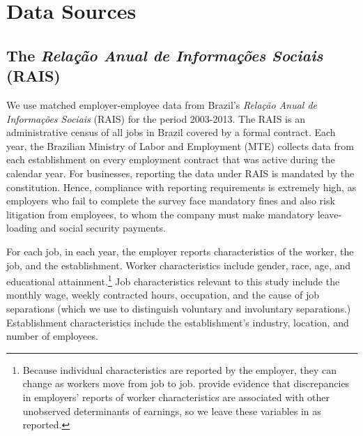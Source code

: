
\section{Data Sources}
\label{app:EmpiricalDetails}

\subsection{The \emph{Rela\c{c}\~{a}o Anual de Informa\c{c}\~{o}es Sociais} (RAIS)}
We use matched employer-employee data from Brazil's \emph{Rela\c{c}\~{a}o Anual de Informa\c{c}\~{o}es Sociais} (RAIS) for the period 2003-2013.
The RAIS is an administrative census of all jobs in Brazil covered by a formal contract. Each year, the Brazilian Ministry of Labor and Employment (MTE) collects data from each establishment on every employment contract that was active during the calendar year. For businesses, reporting the data under RAIS is mandated by the constitution. Hence, compliance with reporting requirements is extremely high, as employers who fail to complete the survey face mandatory fines and also risk litigation from employees, to whom the company must make mandatory leave-loading and social security payments.

For each job, in each year, the employer reports characteristics of the worker, the job, and the establishment. 
Worker characteristics include gender, race, age, and educational attainment.\footnote{ 
Because individual characteristics are reported by the employer, they can change as workers move from job to job. 
\citet*{CRS:Race:JHR:2017} provide evidence that discrepancies in employers' reports of worker characteristics are associated with other unobserved determinants of earnings, so we leave these variables in as reported.} 
Job characteristics relevant to this study include the monthly wage, weekly contracted hours, occupation, and the cause of job separations (which we use to distinguish voluntary and involuntary separations.) Establishment characteristics include the establishment's industry, location, and number of employees. 

